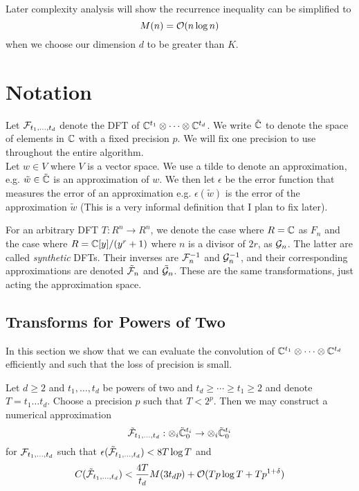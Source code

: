 Later complexity analysis will show the recurrence inequality can be simplified to
\[
    M(n) = \mathcal O(n \log n)
\]
when we choose our dimension $d$ to be greater than $K$.

\section{Notation}%
\label{sec:Notation}

Let $\mathcal F_{t_1, \ldots, t_d}$ denote the DFT of ${\mathbb C}^{t_1} \otimes \cdots \otimes {\mathbb C}^{t_d}$.
We write $\tilde{{\mathbb C}}$ to denote the space of elements in ${\mathbb C}$ with a fixed precision $p$. We will fix one precision to use throughout the entire algorithm.\\
Let $w \in V$ where $V$ is a vector space. We use a tilde to denote an approximation, e.g. $\tilde{w} \in \tilde{{\mathbb C}}$ is an approximation of $w$. We then let $\epsilon$ be the error function that measures the error of an approximation e.g. $\epsilon(\tilde{w})$ is the error of the approximation $\tilde{w}$ (This is a very informal definition that I plan to fix later).

For an arbitrary DFT $T: R^n \to R^n$, we denote the case where $R = {\mathbb C}$ as $F_n$ and the case where $R = {\mathbb C}[y]/(y^r + 1)$ where $n$ is a divisor of $2r$, as $\mathcal G_n$. The latter are called \emph{synthetic} DFTs.
Their inverses are $\mathcal F_n^{-1}$ and $\mathcal G_n^{-1}$, and their corresponding approximations are denoted $\tilde{\mathcal F}_n$ and $\tilde{\mathcal G}_n$. These are the same transformations, just acting the approximation space.


\subsection{Transforms for Powers of Two}

In this section we show that we can evaluate the convolution of ${\mathbb C}^{t_1} \otimes \cdots \otimes {\mathbb C}^{t_d}$ efficiently and such that the loss of precision is small.


\begin{theorem}
    Let $d \geq 2$ and $t_1, \ldots, t_d$ be powers of two and $t_d \geq \cdots \geq t_1 \geq 2$ and denote $T = t_1 \ldots t_d$. Choose a precision $p$ such that $T < 2^p$. Then we may construct a numerical approximation
    \[
        \tilde {\mathcal F}_{t_1, \ldots, t_d} : \otimes_i \tilde{{\mathbb C}}^{t_i}_0 \to \otimes_i \tilde{{\mathbb C}}^{t_i}_0
    \]
    for $\mathcal F_{t_1, \ldots, t_d}$ such that $\epsilon(\tilde{\mathcal F}_{t_1, \ldots, t_d}) < 8 T \log T$ and
    \[
        C(\tilde{\mathcal F}_{t_1, \ldots, t_d}) < \frac{4T}{t_d} M(3t_d p) + \mathcal O(Tp\log T + Tp^{1 + \delta})
    \]
\end{theorem}

